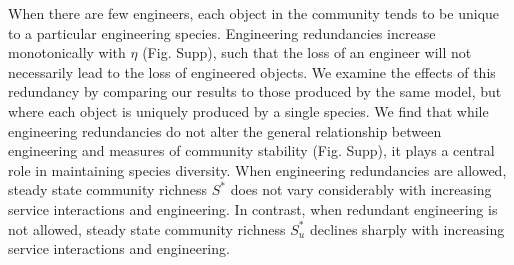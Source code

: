 \documentclass[9pt,twocolumn,twoside]{pnas-new}
\begin{document}


When there are few engineers, each object in the community tends to be unique to a particular engineering species.
Engineering redundancies increase monotonically with $\eta$ (Fig. Supp), such that the loss of an engineer will not necessarily lead to the loss of engineered objects. %
We examine the effects of this redundancy by comparing our results to those produced by the same model, but where each object is uniquely produced by a single species.
We find that while engineering redundancies do not alter the general relationship between engineering and measures of community stability (Fig. Supp), it plays a central role in maintaining species diversity.
When engineering redundancies are allowed, steady state community richness $S^*$ does not vary considerably with increasing service interactions and engineering.
In contrast, when redundant engineering is not allowed, steady state community richness $S^*_u$ declines sharply with increasing service interactions and engineering.




% 
% 
% 
\end{document}
